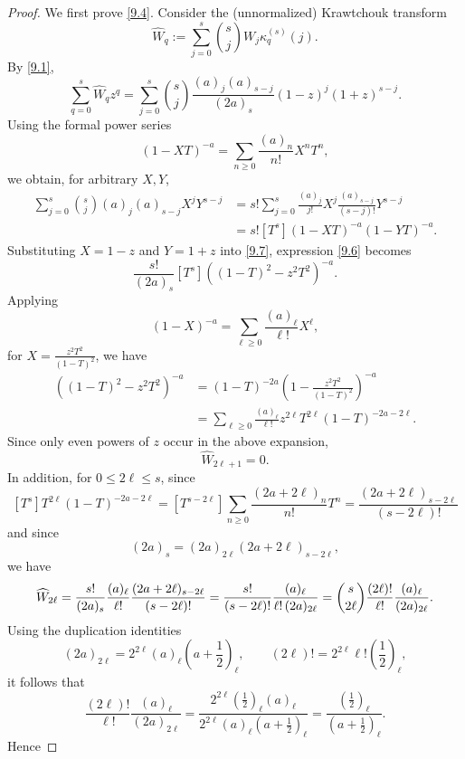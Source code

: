 \documentclass[12pt]{amsart}
\theoremstyle{definition}
\begin{document}
\begin{proof}
We first prove \eqref{9.4}.  Consider the (unnormalized) Krawtchouk
transform
\[
\widehat W_q
:=
\sum_{j=0}^s\binom{s}{j}W_j\kappa_q^{(s)}(j).
\]
By \eqref{9.1},
\begin{equation}\label{9.6}
\sum_{q=0}^s\widehat W_qz^q
=
\sum_{j=0}^s
\binom{s}{j}
\frac{(a)_j(a)_{s-j}}{(2a)_s}
(1-z)^j(1+z)^{s-j}.
\end{equation}
Using the formal power series
\[
(1-XT)^{-a}
=
\sum_{n\ge0}\frac{(a)_n}{n!}X^nT^n,
\]
we obtain, for arbitrary $X,Y$,
\begin{equation}\label{9.7}
\begin{aligned}
\sum_{j=0}^s
\binom{s}{j}(a)_j(a)_{s-j}X^jY^{s-j}
&=
s! 
\sum_{j=0}^s
\frac{(a)_j}{j!}X^j\frac{(a)_{s-j}}{(s-j)!}Y^{s-j}
\\
&=
s![T^s](1-XT)^{-a}(1-YT)^{-a}.
\end{aligned}
\end{equation}
Substituting $X=1-z$ and $Y=1+z$ into \eqref{9.7}, 
expression \eqref{9.6} becomes
\[
\frac{s!}{(2a)_s}[T^s]
\left((1-T)^2-z^2T^2\right)^{-a}.
\]
Applying  
\[
(1-X)^{-a}
=
\sum_{\ell \ge0}\frac{(a)_\ell}{\ell!}X^\ell,
\]
for $X = \frac{z^2T^2}{(1-T)^2}$, we have
\[
\begin{aligned}
\left((1-T)^2-z^2T^2\right)^{-a}
&=
(1-T)^{-2a}
\left(1-\frac{z^2T^2}{(1-T)^2}\right)^{-a}\\
&=
\sum_{\ell\ge0}
\frac{(a)_\ell}{\ell!}
z^{2\ell}T^{2\ell}(1-T)^{-2a-2\ell}.
\end{aligned}
\]
Since only even powers of \(z\) occur in the above expansion,
\[
\widehat W_{2\ell+1}=0.
\]
In addition, for $0\le2\ell\le s$, 
since
\[
[T^s] T^{2\ell}(1-T)^{-2a-2\ell}
=
[T^{s-2\ell }] \sum_{n \ge0}\frac{(2 a + 2\ell)_n}{n!}T^n
=
\frac{(2 a + 2\ell)_{s-2\ell}}{(s-2\ell)!}
\]
and since
\[
(2a)_s=(2a)_{2\ell}(2a+2\ell)_{s-2\ell},
\]
we have
\[
\widehat W_{2\ell}
=
\frac{s!}{(2a)_s}
\frac{(a)_\ell}{\ell!}
\frac{(2a+2\ell)_{s-2\ell}}{(s-2\ell)!}\\
=
\frac{s!}{(s-2\ell)!}
\frac{(a)_\ell}
     {\ell!\,(2a)_{2\ell}}
=
\binom{s}{2\ell}
\frac{(2\ell)!}{\ell!}
\frac{(a)_\ell}
     {(2a)_{2\ell}}.
\]
Using the duplication identities
\[
(2a)_{2\ell}
=
2^{2\ell}(a)_\ell
\left(a+\frac12\right)_\ell,
\qquad
(2\ell)!
=
2^{2\ell}\ell!
\left(\frac12\right)_\ell,
\]
it follows that
\[
\frac{(2\ell)!}{\ell!}
\frac{(a)_\ell}
     {(2a)_{2\ell}}
=
\frac{
2^{2\ell}(\frac12)_\ell (a)_\ell
}{
2^{2\ell}(a)_\ell (a+\frac12)_\ell
}
=
\frac{(\frac12)_\ell}
     {(a+\frac12)_\ell}.
\]
Hence

\end{proof}
\end{document}
